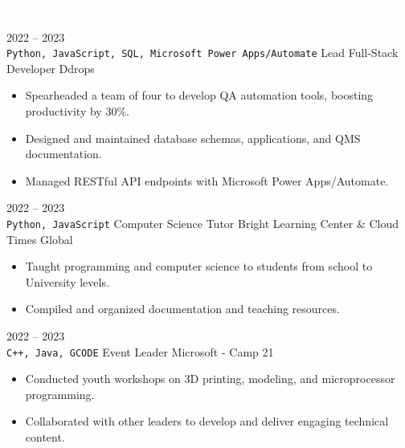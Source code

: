 \documentclass[9pt]{src/developercv} %
\begin{document}

\vspace{\baselineskip} %
\colorbox{sky900}{\textcolor{white}{\LARGE\MakeUppercase{\textbf{Work Experience}}}}\\%

\begin{entrylist}
	\entry
		{2022 -- 2023\\\small{\texttt{Python, JavaScript, SQL, Microsoft Power Apps/Automate}}\hfill}
		{Lead Full-Stack Developer}
		{Ddrops}
		{\begin{itemize}
			\item Spearheaded a team of four to develop QA automation tools, boosting productivity by 30\%.
			\item Designed and maintained database schemas, applications, and QMS documentation.
			\item Managed RESTful API endpoints with Microsoft Power Apps/Automate.
		\end{itemize}}
	\entry
        {2022 -- 2023\\\small{\texttt{Python, JavaScript}}\hfill}
		{Computer Science Tutor}
		{Bright Learning Center \& Cloud Times Global}
		{\begin{itemize}
			\item Taught programming and computer science to students from school to University levels.
			\item Compiled and organized documentation and teaching resources.
		\end{itemize}}
	\entry
        {2022 -- 2023\\\small{\texttt{C++, Java, GCODE}}\hfill}
		{Event Leader}
		{Microsoft - Camp 21}
		{\begin{itemize}
			\item Conducted youth workshops on 3D printing, modeling, and microprocessor programming.
			\item Collaborated with other leaders to develop and deliver engaging technical content.
		\end{itemize}}
\end{entrylist}

\end{document}
